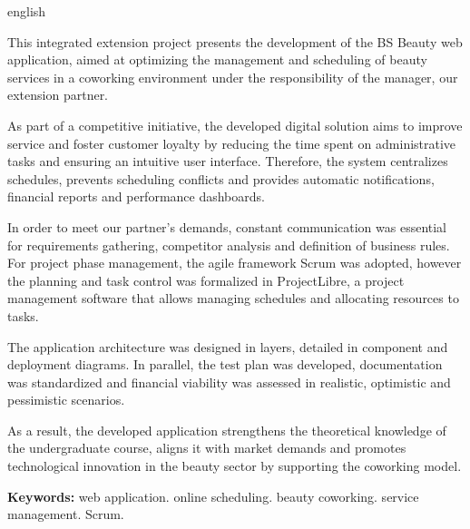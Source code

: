 	\begin{resumo}[abstract]
	\begin{otherlanguage*}{english}
		
		This integrated extension project presents the development of the BS Beauty web application, aimed at optimizing the management and scheduling of beauty services in a coworking environment under the responsibility of the manager, our extension partner.
		
		As part of a competitive initiative, the developed digital solution aims to improve service and foster customer loyalty by reducing the time spent on administrative tasks and ensuring an intuitive user interface. Therefore, the system centralizes schedules, prevents scheduling conflicts and provides automatic notifications, financial reports and performance dashboards.
		
		In order to meet our partner’s demands, constant communication was essential for requirements gathering, competitor analysis and definition of business rules. For project phase management, the agile framework Scrum was adopted, however the planning and task control was formalized in ProjectLibre, a project management software that allows managing schedules and allocating resources to tasks.
		
		The application architecture was designed in layers, detailed in component and deployment diagrams. In parallel, the test plan was developed, documentation was standardized and financial viability was assessed in realistic, optimistic and pessimistic scenarios.
		
		As a result, the developed application strengthens the theoretical knowledge of the undergraduate course, aligns it with market demands and promotes technological innovation in the beauty sector by supporting the coworking model.
		
		\textbf{Keywords:} web application. online scheduling. beauty coworking. service management. Scrum.
		
	\end{otherlanguage*}
\end{resumo}